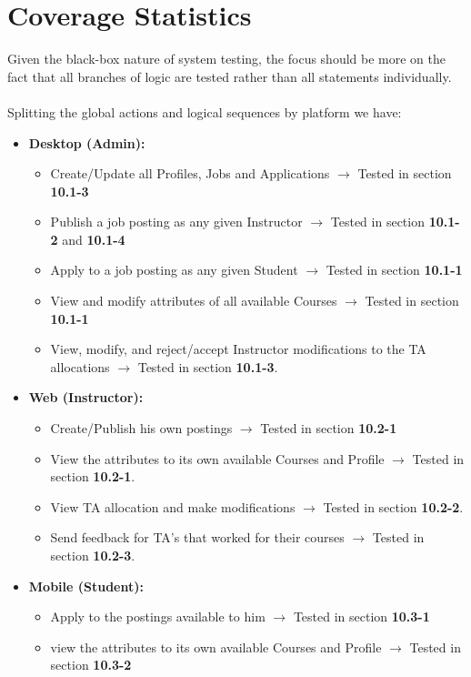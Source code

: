 \documentclass[12pt]{report}
\begin{document}
\section{Coverage Statistics}
Given the black-box nature of system testing, the focus should be more on the fact
that all branches of logic are tested rather than all statements individually.\\\\
Splitting the global actions and logical sequences by platform we have:
\begin{itemize}
    \item \textbf{Desktop (Admin):}
    \begin{itemize}
		\item Create/Update all Profiles, Jobs and Applications $\rightarrow$ Tested in section \textbf{10.1-3}
        \item Publish a job posting as any given Instructor $\rightarrow$ Tested in section \textbf{10.1-2} and \textbf{10.1-4}
        \item Apply to a job posting as any given Student $\rightarrow$ Tested in section \textbf{10.1-1} 
		\item View and modify attributes of all available Courses $\rightarrow$ Tested in section
			\textbf{10.1-1}
		\item View, modify, and reject/accept Instructor modifications to the TA allocations
			$\rightarrow$ Tested in section \textbf{10.1-3}.
    \end{itemize}
    \item \textbf{Web (Instructor):}
        \begin{itemize}
        \item Create/Publish his own postings $\rightarrow$ Tested in section \textbf{10.2-1}
        \item View the attributes to its own available Courses and Profile $\rightarrow$ Tested in
			section \textbf{10.2-1}.
		\item View TA allocation and make modifications $\rightarrow$ Tested in section
			\textbf{10.2-2}.
		\item Send feedback for TA's that worked for their courses $\rightarrow$ Tested in section
			\textbf{10.2-3}.
    \end{itemize}
    \item \textbf{Mobile (Student):}
        \begin{itemize}
        \item Apply to the postings available to him $\rightarrow$ Tested in section \textbf{10.3-1}
		\item view the attributes to its own available Courses and Profile $\rightarrow$ Tested in
			section \textbf{10.3-2}
    \end{itemize}
\end{itemize}
\end{document}
